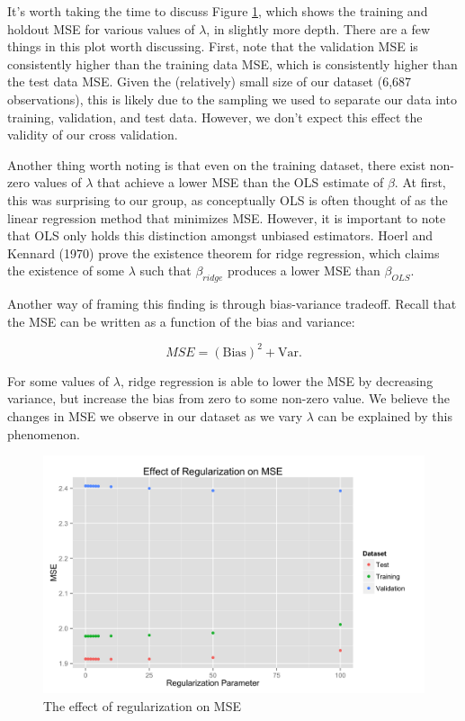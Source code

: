 \documentclass[fleqn,12pt]{SelfArx} %
\begin{document}
It's worth taking the time to discuss Figure \ref{fig:mse_plot}, which shows the training and holdout MSE for various values of $\lambda$, in slightly more depth. There are a few things in this plot worth discussing. First, note that the validation MSE is consistently higher than the training data MSE, which is consistently higher than the test data MSE. Given the (relatively) small size of our dataset (6,687 observations), this is likely due to the sampling we used to separate our data into training, validation, and test data. However, we don't expect this effect the validity of our cross validation.

Another thing worth noting is that even on the training dataset, there exist non-zero values of $\lambda$ that achieve a lower MSE than the OLS estimate of $\beta$. At first, this was surprising to our group, as conceptually OLS is often thought of as the linear regression method that minimizes MSE. However, it is important to note that OLS only holds this distinction amongst unbiased estimators. Hoerl and Kennard (1970) \cite{hoerl1970ridge} prove the existence theorem for ridge regression, which claims the existence of some $\lambda$ such that $\beta_{ridge}$ produces a lower MSE than $\beta_{OLS}$. 

Another way of framing this finding is through bias-variance tradeoff. Recall that the MSE can be written as a function of the bias and variance:

\begin{equation}
MSE = (\textrm{Bias})^2 + \textrm{Var}.
\end{equation}

\noindent For some values of $\lambda$, ridge regression is able to lower the MSE by decreasing variance, but increase the bias from zero to some non-zero value. We believe the changes in MSE we observe in our dataset as we vary $\lambda$ can be explained by this phenomenon.

\begin{figure}[ht]\centering
\includegraphics[width=\linewidth]{mse_plot.png}
\caption{The effect of regularization on MSE}
\label{fig:mse_plot}
\end{figure}
\end{document}

